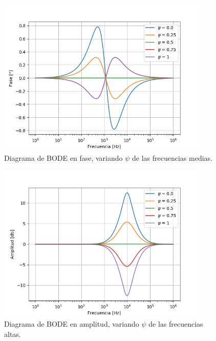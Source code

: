 \documentclass[a4paper]{article}
\begin{document}
\begin{figure}[H]
\centering
	\includegraphics[width=0.9\textwidth]{Imagenes/Medium-psi-ph.png}
	\caption{Diagrama de BODE en fase, variando $\psi$ de las frecuencias medias.}
	\label{fig:bode_ph_low}
\end{figure}

\begin{figure}[H]
\centering
	\includegraphics[width=0.9\textwidth]{Imagenes/High-psi-bode.png}
	\caption{Diagrama de BODE en amplitud, variando $\psi$ de las frecuencias altas.}
	\label{fig:bode_modulo_low}
\end{figure}
\end{document}
